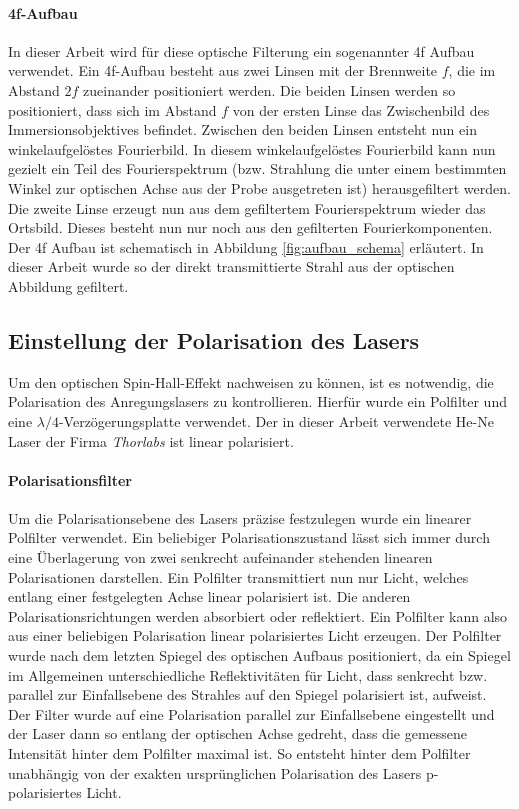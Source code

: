\documentclass[titlepage]{article}
\begin{document}
	\paragraph{4f-Aufbau}
		In dieser Arbeit wird für diese optische Filterung ein sogenannter 4f Aufbau verwendet. Ein 4f-Aufbau besteht aus zwei Linsen mit der Brennweite $f$, die im Abstand $2f$ zueinander positioniert werden. Die beiden Linsen werden so positioniert, dass sich im Abstand $f$ von der ersten Linse das Zwischenbild des Immersionsobjektives befindet. Zwischen den beiden Linsen entsteht nun ein winkelaufgelöstes Fourierbild. In diesem winkelaufgelöstes Fourierbild kann nun gezielt ein Teil des Fourierspektrum (bzw. Strahlung die unter einem bestimmten Winkel zur optischen Achse aus der Probe ausgetreten ist) herausgefiltert werden. Die zweite Linse erzeugt nun aus dem gefiltertem Fourierspektrum wieder das Ortsbild. Dieses besteht nun nur noch aus den gefilterten Fourierkomponenten. Der 4f Aufbau ist schematisch in Abbildung \ref{fig:aufbau_schema} erläutert. In dieser Arbeit wurde so der direkt transmittierte Strahl aus der optischen Abbildung gefiltert.
\subsection{Einstellung der Polarisation des Lasers}
		Um den optischen Spin-Hall-Effekt nachweisen zu können, ist es notwendig, die Polarisation des Anregungslasers zu kontrollieren. Hierfür wurde ein Polfilter und eine $\lambda /4$-Verzögerungsplatte verwendet. Der in dieser Arbeit verwendete He-Ne Laser der Firma \textit{Thorlabs} ist linear polarisiert. 
	\paragraph{Polarisationsfilter}	
		 Um die Polarisationsebene des Lasers präzise festzulegen wurde ein linearer Polfilter verwendet. Ein beliebiger Polarisationszustand lässt sich immer durch eine Überlagerung von zwei senkrecht aufeinander stehenden linearen Polarisationen darstellen. Ein Polfilter transmittiert nun nur Licht, welches entlang einer festgelegten Achse linear polarisiert ist. Die anderen Polarisationsrichtungen werden absorbiert oder reflektiert. Ein Polfilter kann also aus einer beliebigen Polarisation linear polarisiertes Licht erzeugen. Der  Polfilter wurde nach dem letzten Spiegel des optischen Aufbaus positioniert, da ein Spiegel im Allgemeinen unterschiedliche Reflektivitäten für Licht, dass senkrecht bzw. parallel zur Einfallsebene des Strahles auf den Spiegel polarisiert ist, aufweist. Der Filter wurde auf eine Polarisation parallel zur Einfallsebene eingestellt und der Laser dann so entlang der optischen Achse gedreht, dass die gemessene Intensität hinter dem Polfilter maximal ist. So entsteht hinter dem Polfilter unabhängig  von der exakten ursprünglichen Polarisation des Lasers p-polarisiertes Licht.
\end{document}
